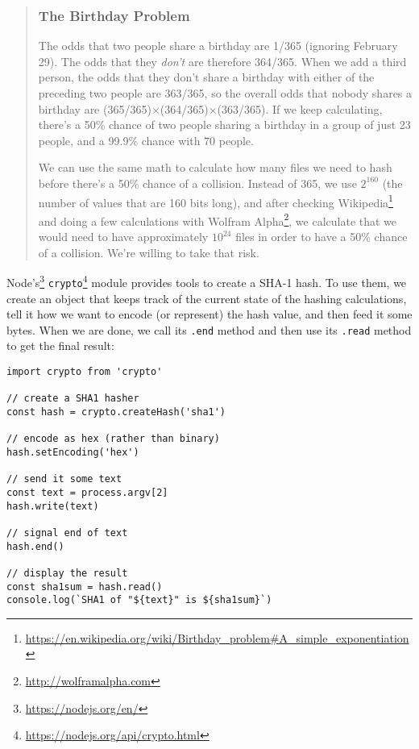 \documentclass[krantzl]{krantz}
\newenvironment{callout}{\savenotes\begin{tBox}\begin{quotation}\toggletrue{inbox}\renewcommand{\thempfootnote}{\arabic{footnote}}}{\end{quotation}\vspace{\baselineskip}\end{tBox}\togglefalse{inbox}\spewnotes}
\newcommand{\hreffoot}[2]{{#1}\footnote{\href{#2}{#2}}}
\begin{document}
\begin{callout}


\subsubsection*{The Birthday Problem}


The odds that two people share a birthday are 1/365 (ignoring February 29).
The odds that they \emph{don’t} are therefore 364/365.
When we add a third person,
the odds that they don’t share a birthday with either of the preceding two people are 363/365,
so the overall odds that nobody shares a birthday are (365/365)×(364/365)×(363/365).
If we keep calculating, there’s a 50\% chance of two people sharing a birthday in a group of just 23 people,
and a 99.9\% chance with 70 people.


We can use the same math to calculate how many files we need to hash before there’s a 50\% chance of a collision.
Instead of 365, we use $2^{160}$ (the number of values that are 160 bits long),
and after checking \hreffoot{Wikipedia}{https://en.wikipedia.org/wiki/Birthday\_problem\#A\_simple\_exponentiation}
and doing a few calculations with \hreffoot{Wolfram Alpha}{http://wolframalpha.com},
we calculate that we would need to have approximately $10^{24}$ files
in order to have a 50\% chance of a collision.
We’re willing to take that risk.

\end{callout}


\hreffoot{Node’s}{https://nodejs.org/en/} \hreffoot{\texttt{crypto}}{https://nodejs.org/api/crypto.html} module provides tools to create a SHA-1 hash.
To use them,
we create an object that keeps track of the current state of the hashing calculations,
tell it how we want to encode (or represent) the hash value,
and then feed it some bytes.
When we are done,
we call its \texttt{.end} method
and then use its \texttt{.read} method to get the final result:


\begin{lstlisting}[frame=tblr]
import crypto from 'crypto'

// create a SHA1 hasher
const hash = crypto.createHash('sha1')

// encode as hex (rather than binary)
hash.setEncoding('hex')

// send it some text
const text = process.argv[2]
hash.write(text)

// signal end of text
hash.end()

// display the result
const sha1sum = hash.read()
console.log(`SHA1 of "${text}" is ${sha1sum}`)
\end{lstlisting}
\end{document}
